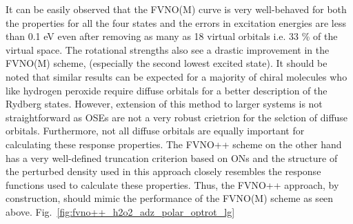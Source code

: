 It can be easily observed that the FVNO(M) curve is very well-behaved for 
both the properties for all the four states and the errors in excitation energies 
are less than 0.1 eV even after removing as many as 18 virtual orbitals i.e. 33 \% of the virtual
space. The rotational strengths also see a drastic improvement in the FVNO(M) scheme,
(especially the second lowest excited state).
It should be noted that similar results can be expected for a majority of chiral molecules who 
like hydrogen peroxide require diffuse orbitals for a better description of the
Rydberg states. However, extension of this method to larger systems is not 
straightforward as OSEs are not a very robust crietrion for the selction of diffuse 
orbitals. Furthermore, not all diffuse orbitals are equally important for 
calculating these response properties. The FVNO++ scheme on the other hand has a very well-defined 
truncation criterion based on ONs and the structure of the perturbed density used in this 
approach closely resembles the response functions used to calculate these 
properties. Thus, the FVNO++ approach, by construction, should mimic the performance of the FVNO(M)
scheme as seen above. Fig.~\ref{fig:fvno++_h2o2_adz_polar_optrot_lg} 
